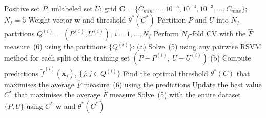 \documentclass{article}
\begin{document}
\begin{algorithm}[!h]
\renewcommand{\algorithmicrequire}{\textbf{Input:}}
\renewcommand{\algorithmicensure}{\textbf{Output:}}
	\caption{RankSVM: pairwise RSVM based LPU algorithm}
	\begin{algorithmic}[1]
	    \REQUIRE
	    Positive set $P$; unlabeled set $U$;
	    grid $\bar{\mathbf{C}}=\{C_{min},\dots,10^{-5},10^{-4},10^{-3},\dots,C_{max}\}$;
	    $N_{f}=5$
	    \ENSURE
	    Weight vector $\mathbf{w}$ and threshold $\theta^{\ast}(C^{\ast})$
	    \STATE Partition $P$ and $U$ into $N_{f}$ partitions
	    $Q^{(i)}=(P^{(i)},U^{(i)})$, $i=1,\dots,N_{f}$
	    \STATE Perform $N_{f}$-fold CV with the $\hat{F}$ measure~(6) using the partitions
	    $\{Q^{(i)}\}$: %
	    \STATE \quad (a) Solve~(5) using any pairwise RSVM method for each split of the training
	    set $(P-P^{(i)},\ U-U^{(i)})$ %
	    \STATE \quad (b) Compute predictions $\tilde{f}^{(i)}(\mathbf{x}_{j})$,
	    $\{j: j\in Q^{(i)}\}$
	    \STATE Find the optimal threshold $\theta^{\ast}(C)$ that maximises the average
	    $\hat{F}$ measure~(6) using the predictions %
	    \STATE Update the best value $C^{\ast}$ that maximises the average $\hat{F}$ measure
	    \ENDFOR
	    \STATE Solve~(5) with the entire dataset $\{P,U\}$ using $C^{\ast}$
		\RETURN $\mathbf{w}$ and $\theta^{\ast}(C^{\ast})$
	\end{algorithmic}
\end{algorithm}
\end{document}
